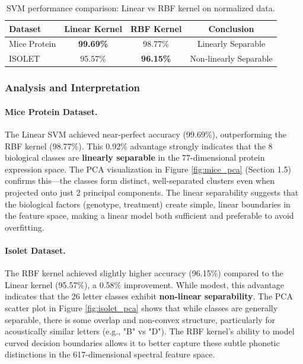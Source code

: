\documentclass[12pt]{article}
\begin{document}
\begin{table}[H]
\centering
\begin{tabular}{lccc}
\toprule
\textbf{Dataset} & \textbf{Linear Kernel} & \textbf{RBF Kernel} & \textbf{Conclusion} \\
\midrule
Mice Protein & \textbf{99.69\%} & 98.77\% & Linearly Separable \\
ISOLET & 95.57\% & \textbf{96.15\%} & Non-linearly Separable \\
\bottomrule
\end{tabular}
\caption{SVM performance comparison: Linear vs RBF kernel on normalized data.}
\label{tab:svm_separability}
\end{table}

\subsubsection{Analysis and Interpretation}

\paragraph{Mice Protein Dataset.} The Linear SVM achieved near-perfect accuracy (99.69\%), outperforming the RBF kernel (98.77\%). This 0.92\% advantage strongly indicates that the 8 biological classes are \textbf{linearly separable} in the 77-dimensional protein expression space. The PCA visualization in Figure \ref{fig:mice_pca} (Section 1.5) confirms this—the classes form distinct, well-separated clusters even when projected onto just 2 principal components. The linear separability suggests that the biological factors (genotype, treatment) create simple, linear boundaries in the feature space, making a linear model both sufficient and preferable to avoid overfitting.

\paragraph{Isolet Dataset.} The RBF kernel achieved slightly higher accuracy (96.15\%) compared to the Linear kernel (95.57\%), a 0.58\% improvement. While modest, this advantage indicates that the 26 letter classes exhibit \textbf{non-linear separability}. The PCA scatter plot in Figure \ref{fig:isolet_pca} shows that while classes are generally separable, there is some overlap and non-convex structure, particularly for acoustically similar letters (e.g., "B" vs "D"). The RBF kernel's ability to model curved decision boundaries allows it to better capture these subtle phonetic distinctions in the 617-dimensional spectral feature space.
\end{document}
